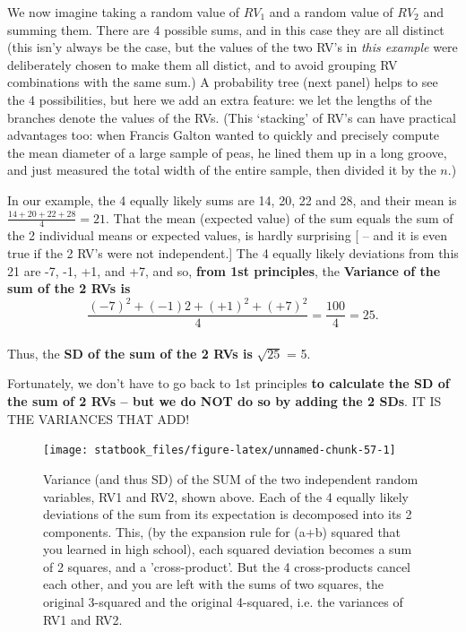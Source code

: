 \documentclass[]{book}
\begin{document}
We now imagine taking a random value of \(RV_1\) and a random value of \(RV_2\) and summing them. There are 4 possible sums, and in this case they are all distinct (this isn'y always be the case, but the values of the two RV's in \emph{this example} were deliberately chosen to make them all distict, and to avoid grouping RV combinations with the same sum.) A probability tree (next panel) helps to see the 4 possibilities, but here we add an extra feature: we let the lengths of the branches denote the values of the RVs. (This `stacking' of RV's can have practical advantages too: when Francis Galton wanted to quickly and precisely compute the mean diameter of a large sample of peas, he lined them up in a long groove, and just measured the total width of the entire sample, then divided it by the \(n\).)

In our example, the 4 equally likely sums are 14, 20, 22 and 28, and their mean is \(\frac{14+20+22+28}{4} = 21.\) That the mean (expected value) of the sum equals the sum of the 2 individual means or expected values, is hardly surprising {[} -- and it is even true if the 2 RV's were not independent.{]} The 4 equally likely deviations from this 21 are -7, -1, +1, and +7, and so, \textbf{from 1st principles}, the \textbf{Variance of the sum of the 2 RVs is}
\[\frac{(-7)^2 + (-1)2 +  (+1)^2 +  (+7)^2}{4} = \frac{100}{4} = 25.\]\\
Thus, the \textbf{SD of the sum of the 2 RVs is} \(\sqrt{25}\) = 5.

Fortunately, we don't have to go back to 1st principles \textbf{to calculate the SD of the sum of 2 RVs -- but we do NOT do so by adding the 2 SDs}. IT IS THE VARIANCES THAT ADD!

\begin{figure}

{\centering \texttt{[image: statbook\_files/figure-latex/unnamed-chunk-57-1]} 

}

\caption{Variance (and thus SD) of the SUM of the two independent random variables, RV1 and RV2, shown above. Each of the 4 equally likely deviations of the sum from its expectation is decomposed into its 2 components. This, (by the expansion rule for (a+b) squared that you learned in high school), each squared deviation becomes a sum of 2 squares, and a 'cross-product'. But the 4 cross-products cancel each other, and you are left with the sums of two squares, the original 3-squared and the  original 4-squared, i.e. the variances of RV1 and RV2.}\label{fig:unnamed-chunk-57}
\end{figure}
\end{document}
